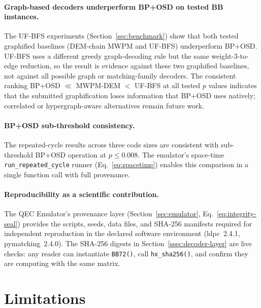 \documentclass[11pt,a4paper]{article}
\begin{document}
\paragraph{Graph-based decoders underperform BP+OSD on tested BB instances.}
The UF-BFS experiments (Section~\ref{sec:benchmark}) show that both tested graphified baselines (DEM-chain MWPM and UF-BFS) underperform BP+OSD.
UF-BFS uses a different greedy graph-decoding rule but the same weight-3-to-edge reduction, so the result is evidence against these two graphified baselines, not against all possible graph or matching-family decoders.
The consistent ranking BP+OSD $\ll$ MWPM-DEM $<$ UF-BFS at all tested $p$ values indicates that the submitted graphification loses information that BP+OSD uses natively; correlated or hypergraph-aware alternatives remain future work.

\paragraph{BP+OSD sub-threshold consistency.}
The repeated-cycle results across three code sizes are consistent with
sub-threshold BP+OSD operation at $p\le0.008$.
The emulator's space-time \texttt{run\_repeated\_cycle} runner
(Eq.~\ref{eq:spacetime}) enables this comparison in a single function call
with full provenance.

\paragraph{Reproducibility as a scientific contribution.}
The QEC Emulator's provenance layer (Section~\ref{sec:emulator},
Eq.~\ref{eq:integrity-seal}) provides the scripts, seeds, data files, and SHA-256 manifests required for
independent reproduction in the declared software environment (ldpc~2.4.1, pymatching~2.4.0).
The SHA-256 digests in Section~\ref{ssec:decoder-layer} are live checks:
any reader can instantiate \texttt{BB72()}, call \texttt{hx\_sha256()},
and confirm they are computing with the same matrix.

\section{Limitations}
\label{sec:limitations}
\end{document}
